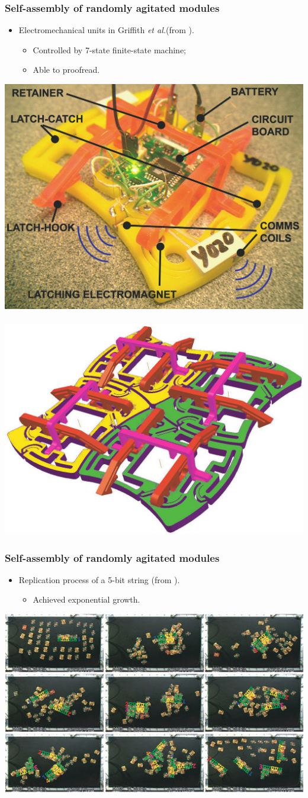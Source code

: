 \documentclass[14pt]{beamer}
\theoremstyle{remark}
\newcommand{\etal}{\textit{et al.}}
\begin{document}
\begin{frame}
  \frametitle{Self-assembly of randomly agitated modules}
  \begin{itemize}
  	 \item Electromechanical units in Griffith \etal (from \cite{griffith_growing_2004}).
  	 \begin{itemize}
  	   \item Controlled by 7-state finite-state machine;
  	   \item Able to proofread.
  	 \end{itemize}
	\end{itemize}
	\begin{center}
	  \includegraphics[width=.4\textwidth]{griffith-000} 
	  ~
	  \includegraphics[width=.4\textwidth]{griffith-001}
	\end{center}
\end{frame}

\begin{frame}
  \frametitle{Self-assembly of randomly agitated modules}
  \begin{itemize}
  	 \item Replication process of a 5-bit string (from \cite{griffith_self-replication_2005}).
  	 \begin{itemize}
  	   \item Achieved exponential growth.
  	 \end{itemize}
	\end{itemize}
	\begin{center}
	  \includegraphics[width=.8\textwidth]{griffith-1}
	\end{center}
\end{frame}
\end{document}
